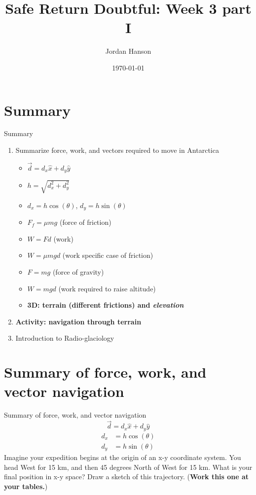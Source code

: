 \documentclass{beamer}
\title{Safe Return Doubtful: Week 3 part I}
\date{\today}
\author{Jordan Hanson}
\institute{Whittier College Department of Physics and Astronomy}
\begin{document}
\maketitle

\section{Summary}

\begin{frame}{Summary}
\begin{enumerate}
\item Summarize force, work, and vectors required to move in Antarctica
\begin{itemize}
\item $\vec{d} = d_x\hat{x}+d_y\hat{y}$
\item $h = \sqrt{d_x^2 + d_y^2}$
\item $d_x = h\cos(\theta)$, $d_y = h\sin(\theta)$
\item $F_f = \mu m g$ (force of friction)
\item $W = Fd$ (work)
\item $W = \mu m g d$ (work specific case of friction)
\item $F = mg$ (force of gravity)
\item $W = mgd$ (work required to raise altitude)
\item \textbf{3D: terrain (different frictions) and \textit{elevation}}
\end{itemize}
\item \textbf{Activity: navigation through terrain}
\item Introduction to Radio-glaciology
\end{enumerate}
\end{frame}

\section{Summary of force, work, and vector navigation}

\begin{frame}{Summary of force, work, and vector navigation}
\begin{equation}
\vec{d} = d_x\hat{x}+d_y\hat{y}
\end{equation}
\begin{align}
d_x &= h\cos(\theta) \\
d_y &= h\sin(\theta)
\end{align}
Imagine your expedition begins at the origin of an x-y coordinate system.  You head West for 15 km, and then 45 degrees North of West for 15 km.  What is your final position in x-y space? Draw a sketch of this trajectory.  (\textbf{Work this one at your tables.})
\end{frame}
\end{document}
